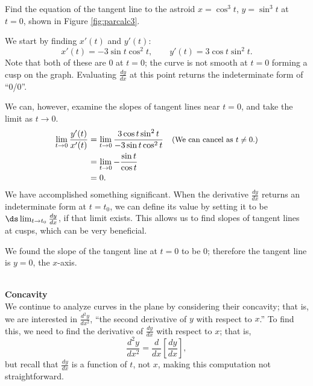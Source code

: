 {Find the equation of the tangent line to the astroid $x=\cos^3 t$, $y=\sin^3t$ at $t=0$, shown in Figure \ref{fig:parcalc3}.
}
{We start by finding $x'(t)$ and $y'(t)$:
$$ x'(t) = -3\sin t\cos^2t, \qquad y'(t) = 3\cos t\sin^2t.$$
Note that both of these are 0 at $t=0$; the curve is not smooth at $t=0$ forming a cusp on the graph. Evaluating $\frac{dy}{dx}$ at this point returns the indeterminate form of ``0/0''. 

We can, however, examine the slopes of tangent lines near $t=0$, and take the limit as $t\to 0$. 
\begin{align*}
\lim_{t\to0} \frac{y'(t)}{x'(t)} &=\lim_{t\to0} \frac{3\cos t\sin^2t}{-3\sin t\cos^2t} \quad \text{\small (We can cancel as $t\neq 0$.)}\\
					&= \lim_{t\to0} -\frac{\sin t}{\cos t}\\
					&= 0.
\end{align*}
We have accomplished something significant. When the derivative $\frac{dy}{dx}$ returns an indeterminate form at $t=t_0$, we can define its value by setting it to be $\ds \lim_{t\to t_0} \frac{dy}{dx}$, if that limit exists. This allows us to find slopes of tangent lines at cusps, which can be very beneficial. 

We found the slope of the tangent line at $t=0$ to be 0; therefore the tangent line is $y=0$, the $x$-axis. 
}\\

\noindent\textbf{\large Concavity}\\

We continue to analyze curves in the plane by considering their concavity; that is, we are interested in $\frac{d^2y}{dx^2}$, ``the second derivative of $y$ with respect to $x$.'' To find this, we need to find the derivative of $\frac{dy}{dx}$ with respect to $x$; that is,  $$\frac{d^2y}{dx^2}=\frac{d}{dx}\left[\frac{dy}{dx}\right],$$ but recall that $\frac{dy}{dx}$ is a function of $t$, not $x$, making this computation not straightforward.

